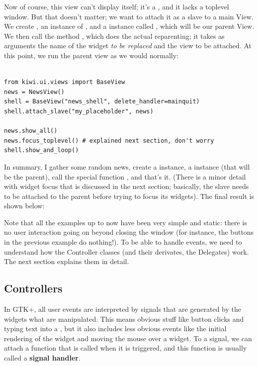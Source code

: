 \documentclass[a4paper]{howto}
\begin{document}
Now of course, this view can't display itself; it's a ,
and it lacks a toplevel window. But that doesn't matter; we want to
attach it as a slave to a main View. We create , an instance
of , and a  instance called
, which will be our parent View. We then call the method
, which does the actual reparenting; it takes as
arguments the name of the widget {\it to be replaced} and the view to be
attached. At this point, we run the parent view as we would normally:

\begin{verbatim}

from kiwi.ui.views import BaseView
news = NewsView()
shell = BaseView("news_shell", delete_handler=mainquit)
shell.attach_slave("my_placeholder", news)

news.show_all()
news.focus_toplevel() # explained next section, don't worry
shell.show_and_loop()
\end{verbatim}

In summary, I gather some random news, create a 
instance, a  instance (that will be the parent), call
the special function , and that's it. (There is a
minor detail with widget focus that is discussed in the next section;
basically, the slave needs to be attached to the parent before trying to
focus its widgets).  The final result is shown below:


Note that all the examples up to now have been very simple and static:
there is no user interaction going on beyond closing the window (for
instance, the buttons in the previous example do nothing!). To be able
to handle events, we need to understand how the Controller classes (and
their derivates, the Delegates) work. The next section explains them in
detail.

\subsection{Controllers}
\label{callbacks}

In GTK+, all user events are interpreted by signals that are generated
by the widgets what are manipulated. This means obvious stuff like
button clicks and typing text into a , but it also
includes less obvious events like the initial rendering of the widget
and moving the mouse over a widget. To a signal, we can attach a
function that is called when it is triggered, and this function is
usually called a {\bf signal handler}.
\end{document}
